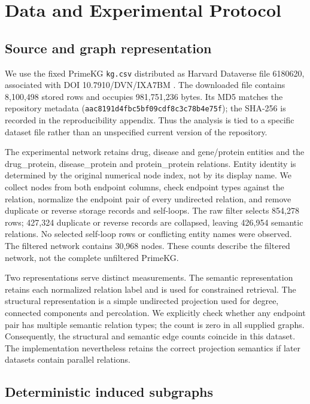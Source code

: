 \section{Data and Experimental Protocol}
\label{sec:data}

\subsection{Source and graph
representation}\label{source-and-graph-representation}

We use the fixed PrimeKG \texttt{kg.csv} distributed as Harvard
Dataverse file 6180620, associated with DOI 10.7910/DVN/IXA7BM \cite{chandak2023primekg}.
The downloaded file contains 8,100,498 stored rows and occupies
981,751,236 bytes. Its MD5 matches the repository metadata
(\texttt{aac8191d4fbc5bf09cdf8c3c78b4e75f}); the SHA-256 is recorded in
the reproducibility appendix. Thus the analysis is tied to a specific
dataset file rather than an unspecified current version of the
repository.

The experimental network retains drug, disease and gene/protein entities
and the drug\_protein, disease\_protein and protein\_protein relations.
Entity identity is determined by the original numerical node index, not
by its display name. We collect nodes from both endpoint columns, check
endpoint types against the relation, normalize the endpoint pair of
every undirected relation, and remove duplicate or reverse storage
records and self-loops. The raw filter selects 854,278 rows; 427,324
duplicate or reverse records are collapsed, leaving 426,954 semantic
relations. No selected self-loop rows or conflicting entity names were
observed. The filtered network contains 30,968 nodes. These counts
describe the filtered network, not the complete unfiltered PrimeKG.

Two representations serve distinct measurements. The semantic
representation retains each normalized relation label and is used for
constrained retrieval. The structural representation is a simple
undirected projection used for degree, connected components and
percolation. We explicitly check whether any endpoint pair has multiple
semantic relation types; the count is zero in all supplied graphs.
Consequently, the structural and semantic edge counts coincide in this
dataset. The implementation nevertheless retains the correct projection
semantics if later datasets contain parallel relations.

\subsection{Deterministic induced
subgraphs}\label{deterministic-induced-subgraphs}

